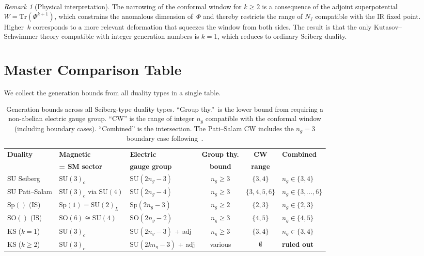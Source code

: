 \documentclass[11pt,a4paper]{article}
\theoremstyle{plain}
\theoremstyle{definition}
\theoremstyle{remark}
\newtheorem{remark}[theorem]{Remark}
\newcommand{\Nf}{N_{\!f}}
\newcommand{\ngen}{n_g}
\newcommand{\SU}[1]{\mathrm{SU}(#1)}
\newcommand{\SO}[1]{\mathrm{SO}(#1)}
\newcommand{\Sp}[1]{\mathrm{Sp}(#1)}
\newcommand{\Tr}{\mathrm{Tr}}
\begin{document}
\begin{remark}[Physical interpretation]
The narrowing of the conformal window for $k \geq 2$ is a consequence
of the adjoint superpotential $W = \Tr(\Phi^{k+1})$, which constrains
the anomalous dimension of~$\Phi$ and thereby restricts the range of
$\Nf$ compatible with the IR fixed point.  Higher~$k$ corresponds to a
more relevant deformation that squeezes the window from both sides.
The result is that the only Kutasov--Schwimmer theory compatible with
integer generation numbers is $k = 1$, which reduces to ordinary
Seiberg duality.
\end{remark}


\section{Master Comparison Table}
\label{sec:master-table}

We collect the generation bounds from all duality types in a single
table.

\begin{table}[h!]
\centering
\renewcommand{\arraystretch}{1.6}
\begin{tabular}{@{}l l l c c l@{}}
\toprule
\textbf{Duality} & \textbf{Magnetic} & \textbf{Electric} &
  \textbf{Group thy.} & \textbf{CW} &
  \textbf{Combined} \\
& \textbf{= SM sector} & \textbf{gauge group} &
  \textbf{bound} & \textbf{range} & \\
\midrule
SU Seiberg & $\SU{3}_c$ & $\SU{2\ngen - 3}$ &
  $\ngen \geq 3$ & $\{3,4\}$ & $\ngen \in \{3,4\}$ \\
SU Pati--Salam & $\SU{3}_c$ via $\SU{4}$ & $\SU{2\ngen - 4}$ &
  $\ngen \geq 3$ & $\{3,4,5,6\}$ & $\ngen \in \{3,...,6\}$ \\
$\Sp{}$ (IS) & $\Sp{1} = \SU{2}_L$ & $\Sp{2\ngen - 3}$ &
  $\ngen \geq 2$ & $\{2, 3\}$ & $\ngen \in \{2,3\}$ \\
$\SO{}$ (IS) & $\SO{6} \cong \SU{4}$ & $\SO{2\ngen - 2}$ &
  $\ngen \geq 3$ & $\{4,5\}$ & $\ngen \in \{4,5\}$ \\
KS ($k=1$) & $\SU{3}_c$ & $\SU{2\ngen - 3}$ + adj &
  $\ngen \geq 3$ & $\{3,4\}$ & $\ngen \in \{3,4\}$ \\
KS ($k \geq 2$) & $\SU{3}_c$ & $\SU{2k\ngen - 3}$ + adj &
  various & $\emptyset$ & \textbf{ruled out} \\
\bottomrule
\end{tabular}
\caption{Generation bounds across all Seiberg-type duality types.
``Group thy.''\ is the lower bound from requiring a non-abelian electric
gauge group.  ``CW'' is the range of integer $\ngen$ compatible with the
conformal window (including boundary cases).  ``Combined'' is the
intersection.  The Pati--Salam CW includes the $\ngen = 3$ boundary case
following~\cite{Sannino2011}.}
\label{tab:master}
\end{table}
\end{document}
